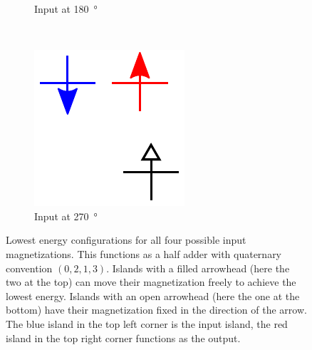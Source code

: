 \documentclass[11pt,a4paper,english]{article}
\newcommand{\rulesep}{\unskip\ \vrule\ }
\begin{document}
\begin{figure}
\begin{subfigure}[t]{0.23\textwidth}
    \caption{Input at \SI{180}{\degree}}
\end{subfigure}
\rulesep
\begin{subfigure}[t]{0.23\textwidth}
    \includegraphics[width=\textwidth]{Figures/half_adder/schematic/000006_inputs_In1_0213/Input 270 deg.pdf}
    \caption{Input at \SI{270}{\degree}}
\end{subfigure}
\caption{Lowest energy configurations for all four possible input magnetizations. This functions as a half adder with quaternary convention $(0,2,1,3)$. Islands with a filled arrowhead (here the two at the top) can move their magnetization freely to achieve the lowest energy. Islands with an open arrowhead (here the one at the bottom) have their magnetization fixed in the direction of the arrow. The blue island in the top left corner is the input island, the red island in the top right corner functions as the output.}
\label{fig:HalfAdder_000006_configurations_In1_0213}
\end{figure}
\end{document}
